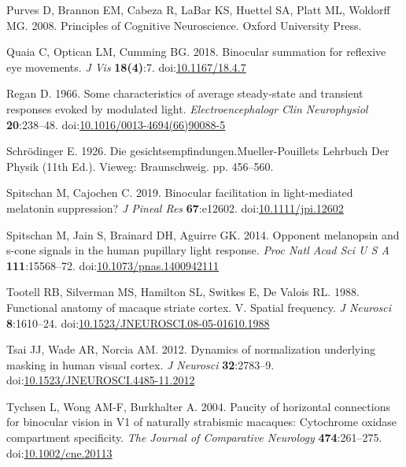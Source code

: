 \documentclass[
]{article}
\newlength{\cslhangindent}
\newlength{\cslentryspacingunit} %
\newenvironment{CSLReferences}[2] %
 {%
  \setlength{\parindent}{0pt}
  \ifodd #1
  \let\oldpar\par
  \def\par{\hangindent=\cslhangindent\oldpar}
  \fi
  \setlength{\parskip}{#2\cslentryspacingunit}
 }%
 {}
\begin{document}
\begin{CSLReferences}{1}{0}
\leavevmode{}%
Purves D, Brannon EM, Cabeza R, LaBar KS, Huettel SA, Platt ML, Woldorff MG. 2008. Principles of {Cognitive} {Neuroscience}. Oxford University Press.

\leavevmode{}%
Quaia C, Optican LM, Cumming BG. 2018. Binocular summation for reflexive eye movements. \emph{J Vis} \textbf{18(4)}:7. doi:\href{https://doi.org/10.1167/18.4.7}{10.1167/18.4.7}

\leavevmode{}%
Regan D. 1966. Some characteristics of average steady-state and transient responses evoked by modulated light. \emph{Electroencephalogr Clin Neurophysiol} \textbf{20}:238--48. doi:\href{https://doi.org/10.1016/0013-4694(66)90088-5}{10.1016/0013-4694(66)90088-5}

\leavevmode{}%
Schrödinger E. 1926. Die gesichtsempfindungen.Mueller-Pouillets Lehrbuch Der Physik (11th Ed.). Vieweg: Braunschweig. pp. 456--560.

\leavevmode{}%
Spitschan M, Cajochen C. 2019. Binocular facilitation in light-mediated melatonin suppression? \emph{J Pineal Res} \textbf{67}:e12602. doi:\href{https://doi.org/10.1111/jpi.12602}{10.1111/jpi.12602}

\leavevmode{}%
Spitschan M, Jain S, Brainard DH, Aguirre GK. 2014. Opponent melanopsin and s-cone signals in the human pupillary light response. \emph{Proc Natl Acad Sci U S A} \textbf{111}:15568--72. doi:\href{https://doi.org/10.1073/pnas.1400942111}{10.1073/pnas.1400942111}

\leavevmode{}%
Tootell RB, Silverman MS, Hamilton SL, Switkes E, De Valois RL. 1988. Functional anatomy of macaque striate cortex. V. Spatial frequency. \emph{J Neurosci} \textbf{8}:1610--24. doi:\href{https://doi.org/10.1523/JNEUROSCI.08-05-01610.1988}{10.1523/JNEUROSCI.08-05-01610.1988}

\leavevmode{}%
Tsai JJ, Wade AR, Norcia AM. 2012. Dynamics of normalization underlying masking in human visual cortex. \emph{J Neurosci} \textbf{32}:2783--9. doi:\href{https://doi.org/10.1523/JNEUROSCI.4485-11.2012}{10.1523/JNEUROSCI.4485-11.2012}

\leavevmode{}%
Tychsen L, Wong AM-F, Burkhalter A. 2004. Paucity of horizontal connections for binocular vision in V1 of naturally strabismic macaques: Cytochrome oxidase compartment specificity. \emph{The Journal of Comparative Neurology} \textbf{474}:261--275. doi:\href{https://doi.org/10.1002/cne.20113}{10.1002/cne.20113}


\end{CSLReferences}
\end{document}
